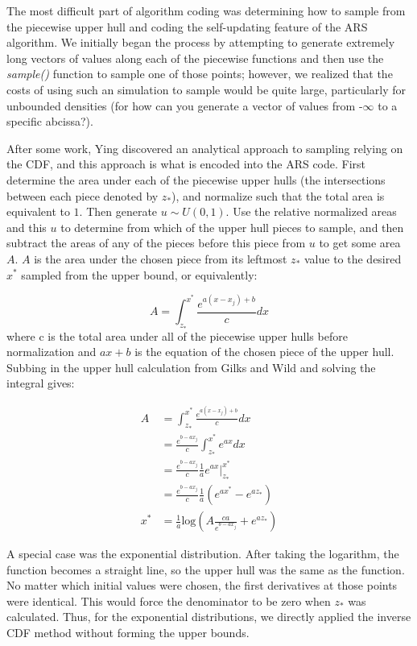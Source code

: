 \documentclass{article}
\begin{document}
The most difficult part of algorithm coding was determining how to sample from the piecewise upper hull and coding the self-updating feature of the ARS algorithm.  We initially began the process by attempting to generate extremely long vectors of values along each of the piecewise functions and then use the \textit{sample()} function to sample one of those points; however, we realized that the costs of using such an simulation to sample would be quite large, particularly for unbounded densities (for how can you generate a vector of values from -$\infty$ to a specific abcissa?).  

After some work, Ying discovered an analytical approach to sampling relying on the CDF, and this approach is what is encoded into the ARS code.  First determine the area under each of the piecewise upper hulls (the intersections between each piece denoted by $z_*$), and normalize such that the total area is equivalent to $1$.  Then generate $u\sim U\left(0, 1\right)$.  Use the relative normalized areas and this $u$ to determine from which of the upper hull pieces to sample, and then subtract the areas of any of the pieces before this piece from $u$ to get some area $A$.  $A$ is the area under the chosen piece from its leftmost $z_*$ value to the desired $x^*$ sampled from the upper bound, or equivalently:

$$A= \int_{z_*}^{x^*}\frac{e^{a\left(x-x_j\right)+b}}{c}dx$$
where c is the total area under all of the piecewise upper hulls before normalization and $ax+b$ is the equation of the chosen piece of the upper hull.  Subbing in the upper hull calculation from Gilks and Wild and solving the integral gives:

\begin{align*}
A &= \int_{z_*}^{x^*}\frac{e^{a\left(x-x_j\right)+b}}{c}dx\\
&= \frac{e^{b-ax_j}}{c}\int_{z_*}^{x^*}e^{ax}dx\\
&= \frac{e^{b-ax_j}}{c}\frac{1}{a}\left.e^{ax}\right|_{z_*}^{x^*}\\
&= \frac{e^{b-ax_j}}{c}\frac{1}{a}\left(e^{ax^*} - e^{az_*}\right)\\
x^* &= \frac{1}{a}\text{log}\left(A\frac{ca}{e^{b-ax_j}}+e^{az_*}\right)
\end{align*}

A special case was the exponential distribution. After taking the logarithm, the function becomes a straight line, so the upper hull was the same as the function. No matter which initial values were chosen, the first derivatives at those points were identical. This would force the denominator to be zero when $z_*$ was calculated. Thus,  for the exponential distributions, we directly applied the inverse CDF method without forming the upper bounds.
\end{document}
